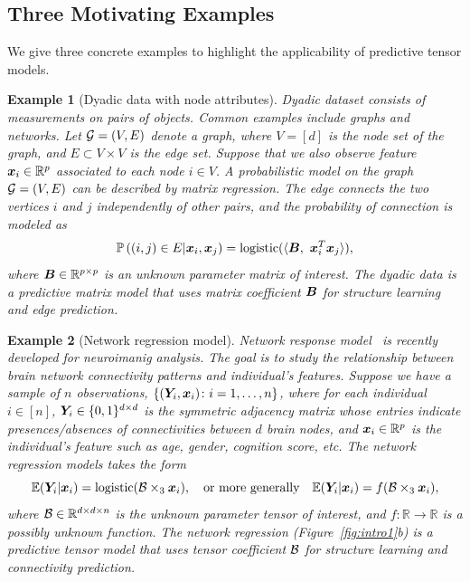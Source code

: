 \documentclass[11pt]{article}
\theoremstyle{exampstyle}
\newtheorem{example}{Example}[section]
\theoremstyle{definition}
\begin{document}
  \vspace{-.2cm}
\subsection{Three Motivating Examples}
  \vspace{-.3cm}
We give three concrete examples to highlight the applicability of predictive tensor models.
 \begin{example}[Dyadic data with node attributes]\label{ex:3} Dyadic dataset consists of measurements on pairs of objects. Common examples include graphs and networks. Let $\mathcal{G}=(V,E)$ denote a graph, where $V=[d]$ is the node set of the graph, and $E\subset V\times V$ is the edge set. Suppose that we also observe feature $\bm x_i\in\mathbb{R}^p$ associated to each node $i\in V$. A probabilistic model on the graph $\mathcal{G}=(V,E)$ can be described by matrix regression. The edge connects the two vertices $i$ and $j$ independently of other pairs, and the probability of connection is modeled as
\begin{equation}\label{eq:edge}
\mathbb{P}\left((i,j)\in E|\bm x_i,\bm x_j \right)=\text{logistic}(\langle \bm B,\ \bm x^T_i\bm x_j\rangle),
 \end{equation}
 where $\bm B\in\mathbb{R}^{p\times p}$ is an unknown parameter matrix of interest. The dyadic data is a predictive matrix model that uses matrix coefficient $\bm B$ for structure learning and edge prediction. 
  \end{example}
  
\begin{example}[Network regression model]\label{example:brain}
Network response model~\cite{zhang2018network} is recently developed for neuroimanig analysis. The goal is to study the relationship between brain network connectivity patterns and individual's features. Suppose we have a sample of $n$ observations, $\{(\bm Y_i, \bm x_i)\colon i=1,\ldots,n\}$, where for each individual $i\in[n]$, $\bm Y_i\in\{0,1\}^{d\times d}$ is the symmetric adjacency matrix whose entries indicate presences/absences of connectivities between $d$ brain nodes, and $\bm x_i\in\mathbb{R}^p$ is the individual's feature such as age, gender, cognition score, etc. The network regression models takes the form
\[
\mathbb{E}(\bm Y_i |\bm x_i)=\text{logistic}(\mathcal{B}\times_3\bm x_i), \quad \text{or more generally}  \quad \mathbb{E}(\bm Y_i |\bm x_i)=f(\mathcal{B}\times_3\bm x_i), 
\]
where $\mathcal{B}\in\mathbb{R}^{d\times d\times n}$ is the unknown parameter tensor of interest, and $f\colon\mathbb{R}\to\mathbb{R}$ is a possibly unknown function. The network regression (Figure~\ref{fig:intro1}b) is a predictive tensor model that uses tensor coefficient $\mathcal{B}$ for structure learning and connectivity prediction.  
\end{example}
 
\end{document}
